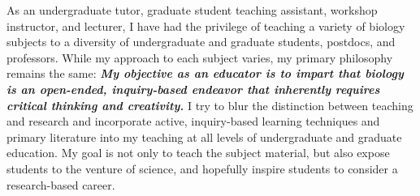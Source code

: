 As an undergraduate tutor, graduate student teaching assistant, workshop
instructor, and lecturer,
I have had the privilege of teaching a variety of biology subjects to a
diversity of undergraduate and graduate students, postdocs, and professors.
While my approach to each subject varies, my primary philosophy remains the
same:
\textbf{\textit{My objective as an educator is to impart that biology is an
open-ended, inquiry-based endeavor that inherently requires critical thinking
and creativity.}}
I try to blur the distinction between teaching and research and incorporate
active, inquiry-based learning techniques and primary literature into my
teaching at all levels of undergraduate and graduate education.
My goal is not only to teach the subject material, but also expose students to
the venture of science, and hopefully inspire students to consider a
research-based career. 


